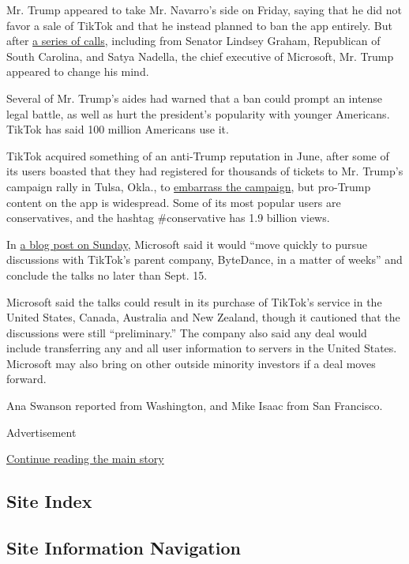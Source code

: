 Mr. Trump appeared to take Mr. Navarro's side on Friday, saying that he
did not favor a sale of TikTok and that he instead planned to ban the
app entirely. But after
\href{https://www.nytimes.com/2020/08/02/business/economy/trump-tiktok-china-national-security.html}{a
series of calls}, including from Senator Lindsey Graham, Republican of
South Carolina, and Satya Nadella, the chief executive of Microsoft, Mr.
Trump appeared to change his mind.

Several of Mr. Trump's aides had warned that a ban could prompt an
intense legal battle, as well as hurt the president's popularity with
younger Americans. TikTok has said 100 million Americans use it.

TikTok acquired something of an anti-Trump reputation in June, after
some of its users boasted that they had registered for thousands of
tickets to Mr. Trump's campaign rally in Tulsa, Okla., to
\href{https://www.nytimes.com/2020/06/21/style/tiktok-trump-rally-tulsa.html}{embarrass
the campaign}, but pro-Trump content on the app is widespread. Some of
its most popular users are conservatives, and the hashtag \#conservative
has 1.9 billion views.

In
\href{https://blogs.microsoft.com/blog/2020/08/02/microsoft-to-continue-discussions-on-potential-tiktok-purchase-in-the-united-states/}{a
blog post on Sunday}, Microsoft said it would ``move quickly to pursue
discussions with TikTok's parent company, ByteDance, in a matter of
weeks'' and conclude the talks no later than Sept. 15.

Microsoft said the talks could result in its purchase of TikTok's
service in the United States, Canada, Australia and New Zealand, though
it cautioned that the discussions were still ``preliminary.'' The
company also said any deal would include transferring any and all user
information to servers in the United States. Microsoft may also bring on
other outside minority investors if a deal moves forward.

Ana Swanson reported from Washington, and Mike Isaac from San Francisco.

Advertisement

\protect\hyperlink{after-bottom}{Continue reading the main story}

\hypertarget{site-index}{%
\subsection{Site Index}\label{site-index}}

\hypertarget{site-information-navigation}{%
\subsection{Site Information
Navigation}\label{site-information-navigation}}

